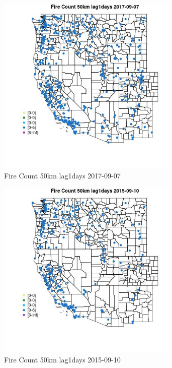 \begin{figure} 
\centering  
\includegraphics[width=0.77\textwidth]{Code_Outputs/Report_ML_input_PM25_Step4_part_e_de_duplicated_aves_compiled_2019-05-21wNAs_MapObsFire_Count_50km_lag1days2017-09-07.jpg} 
\caption{\label{fig:Report_ML_input_PM25_Step4_part_e_de_duplicated_aves_compiled_2019-05-21wNAsMapObsFire_Count_50km_lag1days2017-09-07}Fire Count 50km lag1days 2017-09-07} 
\end{figure} 
 

\begin{figure} 
\centering  
\includegraphics[width=0.77\textwidth]{Code_Outputs/Report_ML_input_PM25_Step4_part_e_de_duplicated_aves_compiled_2019-05-21wNAs_MapObsFire_Count_50km_lag1days2015-09-10.jpg} 
\caption{\label{fig:Report_ML_input_PM25_Step4_part_e_de_duplicated_aves_compiled_2019-05-21wNAsMapObsFire_Count_50km_lag1days2015-09-10}Fire Count 50km lag1days 2015-09-10} 
\end{figure} 
 

